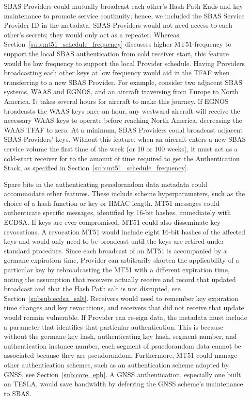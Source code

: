 \documentclass[letterpaper,times]{IONconf/IONconf}
\begin{document}
		SBAS Providers could mutually broadcast each other's Hash Path Ends and key maintenance to promote service continuity; hence, we included the SBAS Service Provider ID in the metadata.
		SBAS Providers would not need access to each other's secrets; they would only act as a repeater.
		Whereas Section~\ref{sub:mt51_schedule_frequency} discusses higher MT51-frequency to support the local SBAS authentication from cold receiver start, this feature would be low frequency to support the local Provider schedule.
		Having Providers broadcasting each other keys at low frequency would aid in the TFAF when transferring to a new SBAS Provider.
		For example, consider two adjacent SBAS systems, WAAS and EGNOS, and an aircraft traversing from Europe to North America.
		It takes several hours for aircraft to make this journey.
		If EGNOS broadcasts the WAAS keys once an hour, any westward aircraft will receive the necessary WAAS keys to operate before reaching North America, decreasing the WAAS TFAF to zero. 
		At a minimum, SBAS Providers could broadcast adjacent SBAS Providers' keys.
		Without this feature, when an aircraft enters a new SBAS service volume the first time of the week (or 10 or 100 weeks), it must act as a cold-start receiver for to the amount of time required to get the Authentication Stack, as specified in Section~\ref{sub:mt51_schedule_frequency}.

		Spare bits in the authenticating psuedorandom data metadata could accommodate other features.
		These include scheme hyperparameters, such as the choice of a hash function or key or HMAC length.
		MT51 messages could authenticate specific messages, identified by 16-bit hashes, immediately with ECDSA.
		If keys are ever compromised, MT51 could also disseminate key revocations.
		A revocation MT51 would include eight 16-bit hashes of the affected keys and would only need to be broadcast until the keys are retired under standard procedure.
		Since each broadcast of an MT51 is accompanied by a germane expiration time, Provider can arbitrarily shorten the applicability of a particular key by rebroadcasting the MT51 with a different expiration time, noting the assumption that receivers actually receive and record that updated broadcast and that the Hash Path salt is not disrupted, see Section~\ref{subsub:ecdsa_salt}.
		Receivers would need to remember key expiration time changes and key revocations, and receivers that did not receive that update would remain vulnerable.
		If Provider can re-sign data, the metadata must include a parameter that identifies that particular authentication.
		This is because without the germane key hash, authenticating key hash, segment number, and authentication instance number, each segment of psuedorandom data cannot be associated because they are pseudorandom.
		Furthermore, MT51 could manage other authentication schemes, such as an authentication scheme adopted by GNSS, see Section~\ref{sub:core_eph}.
		A GNSS authentication, especially one built on TESLA, would save bandwidth by deferring the GNSS scheme's maintenance to SBAS.
\end{document}
